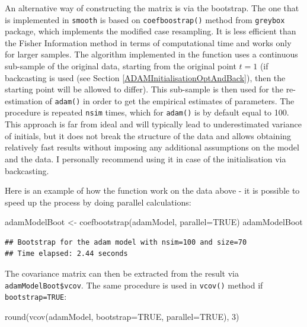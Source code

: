 \documentclass[
]{book}
\newenvironment{Shaded}{\begin{snugshade}}{\end{snugshade}}
\newcommand{\AttributeTok}[1]{\textcolor[rgb]{0.77,0.63,0.00}{#1}}
\newcommand{\ConstantTok}[1]{\textcolor[rgb]{0.00,0.00,0.00}{#1}}
\newcommand{\DecValTok}[1]{\textcolor[rgb]{0.00,0.00,0.81}{#1}}
\newcommand{\FunctionTok}[1]{\textcolor[rgb]{0.00,0.00,0.00}{#1}}
\newcommand{\NormalTok}[1]{#1}
\newcommand{\OtherTok}[1]{\textcolor[rgb]{0.56,0.35,0.01}{#1}}
\theoremstyle{definition}
\theoremstyle{definition}
\theoremstyle{definition}
\theoremstyle{definition}
\theoremstyle{remark}
\begin{document}
An alternative way of constructing the matrix is via the bootstrap. The one that is implemented in \texttt{smooth} is based on \texttt{coefboostrap()} method from \texttt{greybox} package, which implements the modified case resampling. It is less efficient than the Fisher Information method in terms of computational time and works only for larger samples. The algorithm implemented in the function uses a continuous sub-sample of the original data, starting from the original point \(t=1\) (if backcasting is used (see Section \ref{ADAMInitialisationOptAndBack}), then the starting point will be allowed to differ). This sub-sample is then used for the re-estimation of \texttt{adam()} in order to get the empirical estimates of parameters. The procedure is repeated \texttt{nsim} times, which for \texttt{adam()} is by default equal to 100. This approach is far from ideal and will typically lead to underestimated variance of initials, but it does not break the structure of the data and allows obtaining relatively fast results without imposing any additional assumptions on the model and the data. I personally recommend using it in case of the initialisation via backcasting.

Here is an example of how the function work on the data above - it is possible to speed up the process by doing parallel calculations:

\begin{Shaded}
\begin{Highlighting}[]
\NormalTok{adamModelBoot }\OtherTok{\textless{}{-}} \FunctionTok{coefbootstrap}\NormalTok{(adamModel, }\AttributeTok{parallel=}\ConstantTok{TRUE}\NormalTok{)}
\NormalTok{adamModelBoot}
\end{Highlighting}
\end{Shaded}

\begin{verbatim}
## Bootstrap for the adam model with nsim=100 and size=70
## Time elapsed: 2.44 seconds
\end{verbatim}

The covariance matrix can then be extracted from the result via \texttt{adamModelBoot\$vcov}. The same procedure is used in \texttt{vcov()} method if \texttt{bootstrap=TRUE}:

\begin{Shaded}
\begin{Highlighting}[]
\FunctionTok{round}\NormalTok{(}\FunctionTok{vcov}\NormalTok{(adamModel, }\AttributeTok{bootstrap=}\ConstantTok{TRUE}\NormalTok{, }\AttributeTok{parallel=}\ConstantTok{TRUE}\NormalTok{), }\DecValTok{3}\NormalTok{)}
\end{Highlighting}
\end{Shaded}
\end{document}
